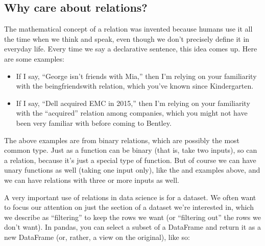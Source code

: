 \documentclass[letterpaper,10pt,english]{sphinxmanual}
\begin{document}
\subsection{Why care about relations?}
\label{\detokenize{chapter-2-mathematical-foundations:why-care-about-relations}}
The mathematical concept of a relation was invented because humans use it all the time when we think and speak, even though we don’t precisely define it in everyday life.  Every time we say a declarative sentence, this idea comes up.  Here are some examples:
\begin{itemize}
\item {} 
If I say, “George isn’t friends with Mia,” then I’m relying on your familiarity with the being\sphinxhyphen{}friends\sphinxhyphen{}with relation, which you’ve known since Kindergarten.

\item {} 
If I say, “Dell acquired EMC in 2015,” then I’m relying on your familiarity with the “acquired” relation among companies, which you might not have been very familiar with before coming to Bentley.

\end{itemize}

The above examples are from binary relations, which are possibly the most common type.  Just as a function can be binary (that is, take two inputs), so can a relation, because it’s just a special type of function.  But of course we can have unary functions as well (taking one input only), like the  and  examples above, and we can have relations with three or more inputs as well.

A very important use of relations in data science is for  a dataset.  We often want to focus our attention on just the section of a dataset we’re interested in, which we describe as “filtering” to keep the rows we want (or “filtering out” the rows we don’t want).  In pandas, you can select a subset of a DataFrame  and return it as a new DataFrame (or, rather, a view on the original), like so:

\begin{sphinxVerbatim}[commandchars=\\\{\}]
\PYG{p}{[}\PYG{p}{]}

\PYG{p}{[}\PYG{p}{[}\PYG{p}{]}  \PYG{p}{]}
\end{sphinxVerbatim}
\end{document}
